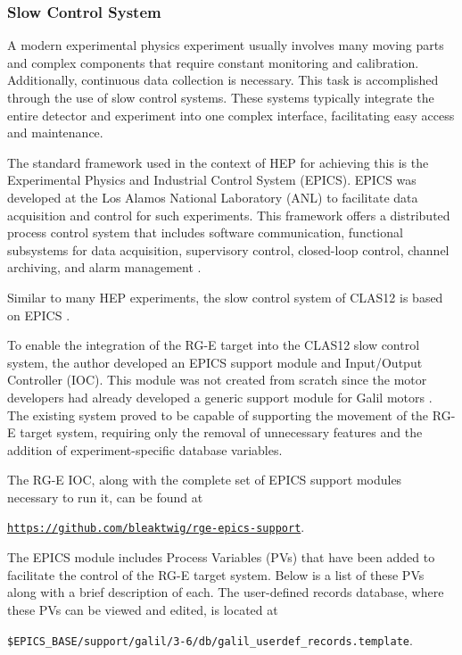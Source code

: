 \subsubsection{Slow Control System}
\label{sssec::slowcontrolsystem}
    A modern experimental physics experiment usually involves many moving parts and complex components that require constant monitoring and calibration.
    Additionally, continuous data collection is necessary.
    This task is accomplished through the use of slow control systems.
    These systems typically integrate the entire detector and experiment into one complex interface, facilitating easy access and maintenance.

    The standard framework used in the context of HEP for achieving this is the Experimental Physics and Industrial Control System (EPICS).
    EPICS was developed at the Los Alamos National Laboratory (ANL) to facilitate data acquisition and control for such experiments.
    This framework offers a distributed process control system that includes software communication, functional subsystems for data acquisition, supervisory control, closed-loop control, channel archiving, and alarm management \cite{dalesio1991}.

    Similar to many HEP experiments, the slow control system of CLAS12 is based on EPICS \cite{boyarinov2020}.

    To enable the integration of the RG-E target into the CLAS12 slow control system, the author developed an EPICS support module and Input/Output Controller (IOC).
    This module was not created from scratch since the motor developers had already developed a generic support module for Galil motors \cite{farnswort2009}.
    The existing system proved to be capable of supporting the movement of the RG-E target system, requiring only the removal of unnecessary features and the addition of experiment-specific database variables.

    The RG-E IOC, along with the complete set of EPICS support modules necessary to run it, can be found at

    \begin{center}
        \hyperlink{https://github.com/bleaktwig/rge-epics-support}{\texttt{https://github.com/bleaktwig/rge-epics-support}}.
    \end{center}

    The EPICS module includes Process Variables (PVs) that have been added to facilitate the control of the RG-E target system.
    Below is a list of these PVs along with a brief description of each.
    The user-defined records database, where these PVs can be viewed and edited, is located at

    \begin{center}
        \texttt{\$EPICS\_BASE/support/galil/3-6/db/galil\_userdef\_records.template}.
    \end{center}

    
    
    
